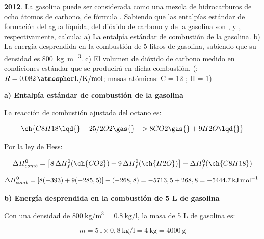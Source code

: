 \begin{exerciseEVAU}
    \textbf{2012}. La gasolina puede ser considerada como una mezcla de hidrocarburos de ocho átomos de carbono, de
    fórmula . Sabiendo que las entalpías estándar de formación del agua líquida, del dióxido de carbono y de la
    gasolina son ,  y , respectivamente, calcula:
    a) La entalpía estándar de combustión de la gasolina. b) La energía desprendida en la combustión de 5 litros de gasolina, sabiendo que su densidad es \SI{800}{\kilo\g\per\cubic\metre}. c) El volumen de dióxido de carbono medido en condiciones estándar que se producirá en dicha combustión.
    (\datos{}: \(R = \ctegases{}\); masas atómicas: C = 12 ; H = 1)

    \begin{solu}

        \textbf{a) Entalpía estándar de combustión de la gasolina}

        La reacción de combustión ajustada del octano es:

        \begin{equation*}
            \ch{C8H18 \lqd{} + 25/2 O2 \gas{} -> 8 CO2 \gas{} + 9 H2O \lqd{}}
        \end{equation*}

        Por la ley de Hess:

        \begin{equation*}
            \Delta H^0_{comb} = \left[ 8\, \Delta H^0_f (\ch{CO2}) + 9\, \Delta H^0_f (\ch{H2O}) \right] - \Delta H^0_f (\ch{C8H18})
        \end{equation*}

        \begin{equation*}
            \Delta H^0_{comb} = \left[ 8(-393) + 9(-285,5) \right] - (-268,8) = -5713,5 + 268,8 = \energia[kjmol]{-5444.7}
        \end{equation*}

        \textbf{b) Energía desprendida en la combustión de 5 L de gasolina}

        Con una densidad de \(\SI{800}{\kilo\g\per\cubic\metre} = \SI{0.8}{\kilo\g\per\litre}\), la masa de 5 L de gasolina es:

        \begin{equation*}
            m = 5 \ \si{\litre} \times 0,8 \ \si{\kilo\g\per\litre} = \SI{4}{\kilo\gram} = \SI{4000}{\gram}
        \end{equation*}


\end{solu}
\end{exerciseEVAU}
